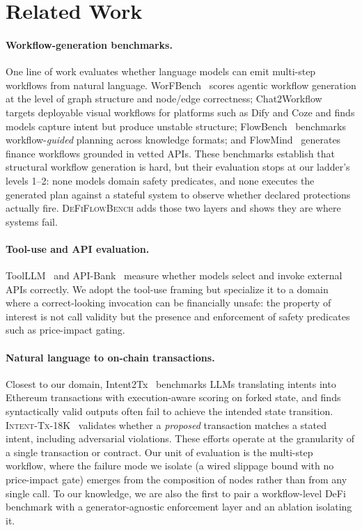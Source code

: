 \section{Related Work}
\label{sec:related}

\paragraph{Workflow-generation benchmarks.} One line of work evaluates
whether language models can emit multi-step workflows from natural
language. WorFBench~\cite{worfbench2025} scores agentic workflow
generation at the level of graph structure and node/edge correctness;
Chat2Workflow~\cite{chat2workflow2026} targets deployable visual
workflows for platforms such as Dify and Coze and finds models capture
intent but produce unstable structure; FlowBench~\cite{flowbench2024}
benchmarks workflow-\emph{guided} planning across knowledge formats; and
FlowMind~\cite{flowmind2023} generates finance workflows grounded in
vetted APIs. These benchmarks establish that structural workflow
generation is hard, but their evaluation stops at our ladder's levels
1--2: none models domain safety predicates, and none executes the
generated plan against a stateful system to observe whether declared
protections actually fire. \textsc{DeFiFlowBench} adds those two layers
and shows they are where systems fail.

\paragraph{Tool-use and API evaluation.} ToolLLM~\cite{toolllm2024} and
API-Bank~\cite{apibank2023} measure whether models select and invoke
external APIs correctly. We adopt the tool-use framing but specialize it
to a domain where a correct-looking invocation can be financially unsafe:
the property of interest is not call validity but the presence and
enforcement of safety predicates such as price-impact gating.

\paragraph{Natural language to on-chain transactions.} Closest to our
domain, Intent2Tx~\cite{intent2tx2026} benchmarks LLMs translating
intents into Ethereum transactions with execution-aware scoring on forked
state, and finds syntactically valid outputs often fail to achieve the
intended state transition. \textsc{Intent-Tx-18K}~\cite{intenttx18k2026}
validates whether a \emph{proposed} transaction matches a stated intent,
including adversarial violations. These efforts operate at
the granularity of a single transaction or contract. Our unit of
evaluation is the multi-step workflow, where the failure mode we isolate
(a wired slippage bound with no price-impact gate) emerges from the
composition of nodes rather than from any single call. To our knowledge,
we are also the first to pair a workflow-level DeFi benchmark with a
generator-agnostic enforcement layer and an ablation isolating it.

